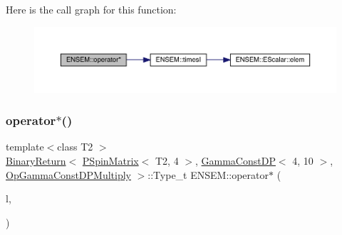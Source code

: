 Here is the call graph for this function\+:\nopagebreak
\begin{figure}[H]
\begin{center}
\leavevmode
\includegraphics[width=350pt]{d6/df5/group__primspinmatrix_ga49c2bb9929a1c38be010fe8c661f3720_cgraph}
\end{center}
\end{figure}
\mbox{\label{group__primspinmatrix_gae0a36eebbac7cf857f48a6bd7966e139}} 
\subsubsection{\texorpdfstring{operator$\ast$()}{operator*()}\hspace{0.1cm}{\footnotesize\ttfamily [59/64]}}
{\footnotesize\ttfamily template$<$class T2 $>$ \\
\mbox{\hyperlink{structENSEM_1_1BinaryReturn}{Binary\+Return}}$<$ \mbox{\hyperlink{classENSEM_1_1PSpinMatrix}{P\+Spin\+Matrix}}$<$ T2, 4 $>$, \mbox{\hyperlink{classENSEM_1_1GammaConstDP}{Gamma\+Const\+DP}}$<$ 4, 10 $>$, \mbox{\hyperlink{structENSEM_1_1OpGammaConstDPMultiply}{Op\+Gamma\+Const\+D\+P\+Multiply}} $>$\+::Type\+\_\+t E\+N\+S\+E\+M\+::operator$\ast$ (\begin{DoxyParamCaption}\item[{const \mbox{\hyperlink{classENSEM_1_1PSpinMatrix}{P\+Spin\+Matrix}}$<$ T2, 4 $>$ \&}]{l,  }\item[{const \mbox{\hyperlink{classENSEM_1_1GammaConstDP}{Gamma\+Const\+DP}}$<$ 4, 10 $>$ \&}]{ }\end{DoxyParamCaption})\hspace{0.3cm}{\ttfamily [inline]}}

\mbox{\label{group__primspinmatrix_gafdfa5cea94c5b8301c476e73bf94071c}} 
